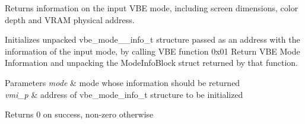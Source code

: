 Returns information on the input V\-B\-E mode, including screen dimensions, color depth and V\-R\-A\-M physical address. 

Initializes unpacked vbe\-\_\-mode\-\_\-\-\_\-info\-\_\-t structure passed as an address with the information of the input mode, by calling V\-B\-E function 0x01 Return V\-B\-E Mode Information and unpacking the Mode\-Info\-Block struct returned by that function.


\begin{DoxyParams}{Parameters}
{\em mode} & mode whose information should be returned \\
\hline
{\em vmi\-\_\-p} & address of vbe\-\_\-mode\-\_\-info\-\_\-t structure to be initialized \\
\hline
\end{DoxyParams}
\begin{DoxyReturn}{Returns}
0 on success, non-\/zero otherwise 
\end{DoxyReturn}
